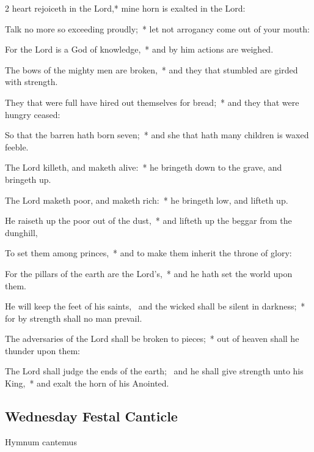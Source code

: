 \begin{multicols}{2}
 heart rejoiceth in the Lord,* mine horn is exalted in the Lord:\par
{}
Talk no more so exceeding proudly;~* let not arrogancy come out of your mouth:\par
For the Lord is a God of knowledge,~* and by him actions are weighed.\par
The bows of the mighty men are broken,~* and they that stumbled are girded with strength.\par
They that were full have hired out themselves for bread;~* and they that were hungry ceased:\par
So that the barren hath born seven;~* and she that hath many children is waxed feeble.\par
The Lord killeth, and maketh alive:~* he bringeth down to the grave, and bringeth up.\par
The Lord maketh poor, and maketh rich:~* he bringeth low, and lifteth up.\par
He raiseth up the poor out of the dust,~* and lifteth up the beggar from the dunghill,\par
To set them among princes,~* and to make them inherit the throne of glory:\par
For the pillars of the earth are the Lord's,~* and he hath set the world upon them.\par
He will keep the feet of his saints,~{\dag} and the wicked shall be silent in darkness;~* for by strength shall no man prevail.\par
The adversaries of the Lord shall be broken to pieces;~* out of heaven shall he thunder upon them:\par
The Lord shall judge the ends of the earth;~{\dag} and he shall give strength unto his King,~* and exalt the horn of his Anointed.

\subsection{Wednesday Festal Canticle}

\begin{inhead}
Hymnum cantemus
\end{inhead}


\end{multicols}
